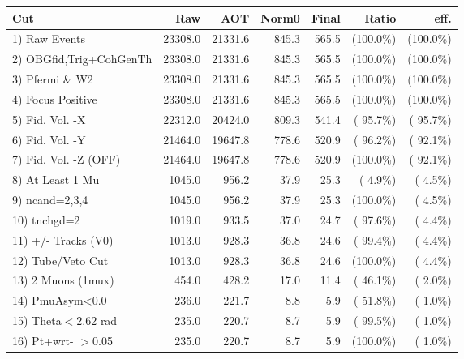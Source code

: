  \begin{table}[h!]\centering
 \begin{tabular}{||l||r|r|r|r|r|r||}
 \hline
 \hline
 Cut & Raw & AOT & Norm0 & Final & Ratio & eff.       \\
 \hline
  1) Raw Events           &      23308.0 &      21331.6 &        845.3 &        565.5 & (100.0\%) & (100.0\%) \\
  2) OBGfid,Trig+CohGenTh &      23308.0 &      21331.6 &        845.3 &        565.5 & (100.0\%) & (100.0\%) \\
  3) Pfermi \& W2         &      23308.0 &      21331.6 &        845.3 &        565.5 & (100.0\%) & (100.0\%) \\
  4) Focus Positive       &      23308.0 &      21331.6 &        845.3 &        565.5 & (100.0\%) & (100.0\%) \\
  5) Fid. Vol. -X         &      22312.0 &      20424.0 &        809.3 &        541.4 & ( 95.7\%) & ( 95.7\%) \\
  6) Fid. Vol. -Y         &      21464.0 &      19647.8 &        778.6 &        520.9 & ( 96.2\%) & ( 92.1\%) \\
  7) Fid. Vol. -Z (OFF)   &      21464.0 &      19647.8 &        778.6 &        520.9 & (100.0\%) & ( 92.1\%) \\
  8) At Least 1 Mu        &       1045.0 &        956.2 &         37.9 &         25.3 & (  4.9\%) & (  4.5\%) \\
  9) ncand=2,3,4          &       1045.0 &        956.2 &         37.9 &         25.3 & (100.0\%) & (  4.5\%) \\
 10) tnchgd=2             &       1019.0 &        933.5 &         37.0 &         24.7 & ( 97.6\%) & (  4.4\%) \\
 11) +/- Tracks (V0)      &       1013.0 &        928.3 &         36.8 &         24.6 & ( 99.4\%) & (  4.4\%) \\
 12) Tube/Veto Cut        &       1013.0 &        928.3 &         36.8 &         24.6 & (100.0\%) & (  4.4\%) \\
 13) 2 Muons (1mux)       &        454.0 &        428.2 &         17.0 &         11.4 & ( 46.1\%) & (  2.0\%) \\
 14) PmuAsym<0.0          &        236.0 &        221.7 &          8.8 &          5.9 & ( 51.8\%) & (  1.0\%) \\
 15) Theta$<$2.62 rad     &        235.0 &        220.7 &          8.7 &          5.9 & ( 99.5\%) & (  1.0\%) \\
 16) Pt+wrt- $>$0.05      &        235.0 &        220.7 &          8.7 &          5.9 & (100.0\%) & (  1.0\%) \\

\end{tabular}
\end{table}
